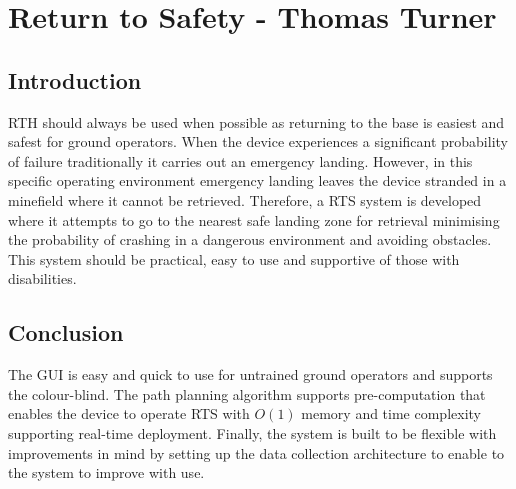 \newpage
{}
\section{Return to Safety - Thomas Turner} \label{Return to Safety}

\subsection{Introduction}\label{sub_section:tgt_RTS_intro}
\gls{RTH} should always be used when possible as returning to the base is easiest and safest for ground operators. When the device experiences a significant probability of failure traditionally it carries out an emergency landing. However, in this specific operating environment emergency landing leaves the device stranded in a minefield where it cannot be retrieved. Therefore, a \gls{RTS} system is developed where it attempts to go to the nearest safe landing zone for retrieval minimising the probability of crashing in a dangerous environment and avoiding obstacles. This system should be practical, easy to use and supportive of those with disabilities.





\subsection{Conclusion}
The \gls{GUI} is easy and quick to use for untrained ground operators and supports the colour-blind. The path planning algorithm supports pre-computation that enables the device to operate \gls{RTS} with $O(1)$ memory and time complexity supporting real-time deployment. Finally, the system is built to be flexible with improvements in mind by setting up the data collection architecture to enable to the system to improve with use. 